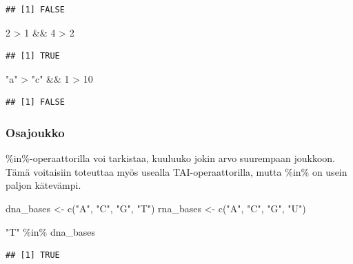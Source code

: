 \documentclass[
]{book}
\newenvironment{Shaded}{\begin{snugshade}}{\end{snugshade}}
\newcommand{\DecValTok}[1]{\textcolor[rgb]{0.00,0.00,0.81}{#1}}
\newcommand{\FunctionTok}[1]{\textcolor[rgb]{0.00,0.00,0.00}{#1}}
\newcommand{\NormalTok}[1]{#1}
\newcommand{\OtherTok}[1]{\textcolor[rgb]{0.56,0.35,0.01}{#1}}
\newcommand{\SpecialCharTok}[1]{\textcolor[rgb]{0.00,0.00,0.00}{#1}}
\newcommand{\StringTok}[1]{\textcolor[rgb]{0.31,0.60,0.02}{#1}}
\begin{document}
\begin{verbatim}
## [1] FALSE
\end{verbatim}

\begin{Shaded}
\begin{Highlighting}[]
\DecValTok{2} \SpecialCharTok{\textgreater{}} \DecValTok{1} \SpecialCharTok{\&\&} \DecValTok{4} \SpecialCharTok{\textgreater{}} \DecValTok{2}
\end{Highlighting}
\end{Shaded}

\begin{verbatim}
## [1] TRUE
\end{verbatim}

\begin{Shaded}
\begin{Highlighting}[]
\StringTok{"a"} \SpecialCharTok{\textgreater{}} \StringTok{"c"} \SpecialCharTok{\&\&} \DecValTok{1} \SpecialCharTok{\textgreater{}} \DecValTok{10}
\end{Highlighting}
\end{Shaded}

\begin{verbatim}
## [1] FALSE
\end{verbatim}

\hypertarget{osajoukko}{%
\subsubsection{Osajoukko}\label{osajoukko}}

\%in\%-operaattorilla voi tarkistaa, kuuluuko jokin arvo suurempaan joukkoon. Tämä voitaisiin toteuttaa myös usealla TAI-operaattorilla, mutta \%in\% on usein paljon kätevämpi.

\begin{Shaded}
\begin{Highlighting}[]
\NormalTok{dna\_bases }\OtherTok{\textless{}{-}} \FunctionTok{c}\NormalTok{(}\StringTok{"A"}\NormalTok{, }\StringTok{"C"}\NormalTok{, }\StringTok{"G"}\NormalTok{, }\StringTok{"T"}\NormalTok{)}
\NormalTok{rna\_bases }\OtherTok{\textless{}{-}} \FunctionTok{c}\NormalTok{(}\StringTok{"A"}\NormalTok{, }\StringTok{"C"}\NormalTok{, }\StringTok{"G"}\NormalTok{, }\StringTok{"U"}\NormalTok{)}

\StringTok{"T"} \SpecialCharTok{\%in\%}\NormalTok{ dna\_bases}
\end{Highlighting}
\end{Shaded}

\begin{verbatim}
## [1] TRUE
\end{verbatim}
\end{document}
